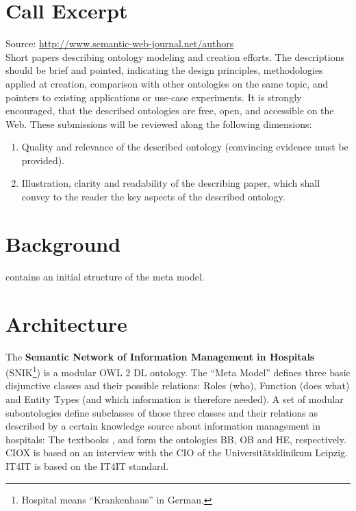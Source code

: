 \documentclass[sw]{iosart2x}
\renewcommand{\citet}{\cite}%
\begin{document}
\section{Call Excerpt}
Source: \url{http://www.semantic-web-journal.net/authors}\\
Short papers describing ontology modeling and creation efforts.
The descriptions should be brief and pointed, indicating the design principles, methodologies applied at creation, comparison with other ontologies on the same topic, and pointers to existing applications or use-case experiments.
It is strongly encouraged, that the described ontologies are free, open, and accessible on the Web.
These submissions will be reviewed along the following dimensions:
\begin{enumerate}
\item Quality and relevance of the described ontology (convincing evidence must be provided).
\item Illustration, clarity and readability of the describing paper, which shall convey to the reader the key aspects of the described ontology.
\end{enumerate}

\section{Background}\label{sec:background}
\citet{domaene} contains an initial structure of the meta model.

\section{Architecture}\label{sec:architecture}
The \textbf{Semantic Network of Information Management in Hospitals} (SNIK\footnote{Hospital means \enquote{Krankenhaus} in German.}) is a modular OWL 2 DL ontology.
The \enquote{Meta Model} defines three basic disjunctive classes and their possible relations: Roles (who), Function (does what) and Entity Types (and which information is therefore needed).
A set of modular subontologies define subclasses of those three classes and their relations as described by a certain knowledge source about information management in hospitals:
The textbooks \citet{bb}, \citet{ob} and \citet{he} form the ontologies BB, OB and HE, respectively. 
CIOX is based on an interview with the CIO of the Universitätsklinikum Leipzig.
IT4IT is based on the IT4IT standard.
\end{document}
